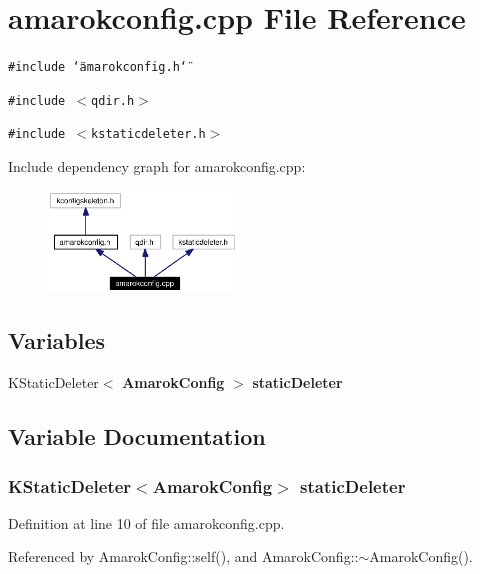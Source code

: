 \section{amarokconfig.cpp File Reference}
\label{amarokconfig_8cpp}


{\tt \#include \char`\"{}amarokconfig.h\char`\"{}}\par
{\tt \#include $<$qdir.h$>$}\par
{\tt \#include $<$kstaticdeleter.h$>$}\par


Include dependency graph for amarokconfig.cpp:\begin{figure}[H]
\begin{center}
\leavevmode
\includegraphics[width=142pt]{amarokconfig_8cpp__incl}
\end{center}
\end{figure}
\subsection*{Variables}
\begin{CompactItemize}
\item 
KStatic\-Deleter$<$ {\bf Amarok\-Config} $>$ {\bf static\-Deleter}
\end{CompactItemize}


\subsection{Variable Documentation}
\subsubsection{\setlength{\rightskip}{0pt plus 5cm}KStatic\-Deleter$<${\bf Amarok\-Config}$>$ {\bf static\-Deleter}\hspace{0.3cm}{\tt  [static]}}\label{amarokconfig_8cpp_a0}




Definition at line 10 of file amarokconfig.cpp.

Referenced by Amarok\-Config::self(), and Amarok\-Config::$\sim$Amarok\-Config().
